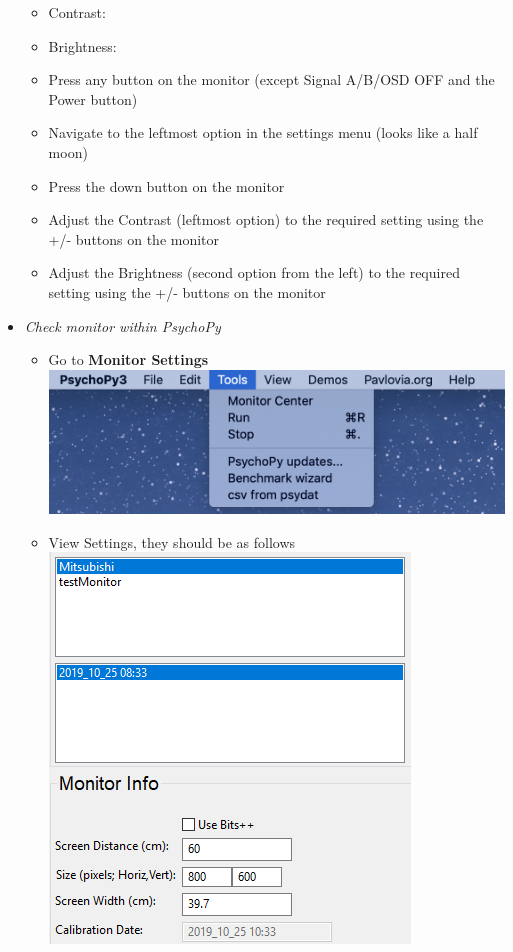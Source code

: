 \documentclass[]{article}
\providecommand{\tightlist}{%
  \setlength{\itemsep}{0pt}\setlength{\parskip}{0pt}}
\begin{document}
\begin{itemize}
  \begin{itemize}
  \item
    Contrast:
  \item
    Brightness:
  \item
    Press any button on the monitor (except Signal A/B/OSD OFF and the
    Power button)
  \item
    Navigate to the leftmost option in the settings menu (looks like a
    half moon)
  \item
    Press the down button on the monitor
  \item
    Adjust the Contrast (leftmost option) to the required setting using
    the +/- buttons on the monitor
  \item
    Adjust the Brightness (second option from the left) to the required
    setting using the +/- buttons on the monitor
  \end{itemize}
\item
  \emph{Check monitor within PsychoPy}

  \begin{itemize}
  \tightlist
  \item
    Go to \textbf{Monitor Settings} \includegraphics{images/pp2.png}
  \item
    View Settings, they should be as follows\\
    \includegraphics{images/pp3.PNG}
  \end{itemize}
\end{itemize}
\end{document}
